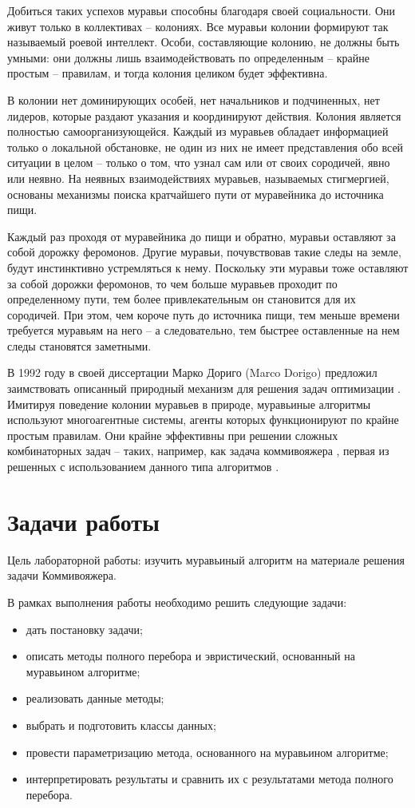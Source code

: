 \documentclass[a4paper,14pt]{extreport}
\begin{document}
Добиться таких успехов муравьи способны благодаря своей социальности.
Они живут только в коллективах – колониях. Все муравьи колонии формируют так называемый роевой интеллект.
Особи, составляющие колонию, не должны быть умными: они должны лишь взаимодействовать по определенным – крайне простым – правилам, и тогда колония целиком будет эффективна.

В колонии нет доминирующих особей, нет начальников и подчиненных, нет лидеров, которые раздают указания и координируют действия.
Колония является полностью самоорганизующейся.
Каждый из муравьев обладает информацией только о локальной обстановке, не один из них не имеет представления обо всей ситуации в целом – только о том, что узнал сам или от своих сородичей, явно или неявно.
На неявных взаимодействиях муравьев, называемых стигмергией, основаны механизмы поиска кратчайшего пути от муравейника до источника пищи.

Каждый раз проходя от муравейника до пищи и обратно, муравьи оставляют за собой дорожку феромонов.
Другие муравьи, почувствовав такие следы на земле, будут инстинктивно устремляться к нему.
Поскольку эти муравьи тоже оставляют за собой дорожки феромонов, то чем больше муравьев проходит по определенному пути, тем более привлекательным он становится для их сородичей.
При этом, чем короче путь до источника пищи, тем меньше времени требуется муравьям на него – а следовательно, тем быстрее оставленные на нем следы становятся заметными.

В 1992 году в своей диссертации Марко Дориго (Marco Dorigo) предложил заимствовать описанный природный механизм для решения задач оптимизации \cite{Dorigo}.
Имитируя поведение колонии муравьев в природе, муравьиные алгоритмы используют многоагентные системы, агенты которых функционируют по крайне простым правилам.
Они крайне эффективны при решении сложных комбинаторных задач – таких, например, как задача коммивояжера \cite{TSPr}, первая из решенных с использованием данного типа алгоритмов \cite{Mueller}.

\section*{Задачи работы}

Цель лабораторной работы: изучить муравьиный алгоритм на материале решения задачи Коммивояжера.

В рамках выполнения работы необходимо решить следующие задачи:
\begin{itemize}
	\item дать постановку задачи;
	\item описать методы полного перебора и эвристический, основанный на муравьином алгоритме;
	\item реализовать данные методы;
	\item выбрать и подготовить классы данных;
	\item провести параметризацию метода, основанного на муравьином алгоритме;
	\item интерпретировать результаты и сравнить их с результатами метода полного перебора.
\end{itemize}
\end{document}
